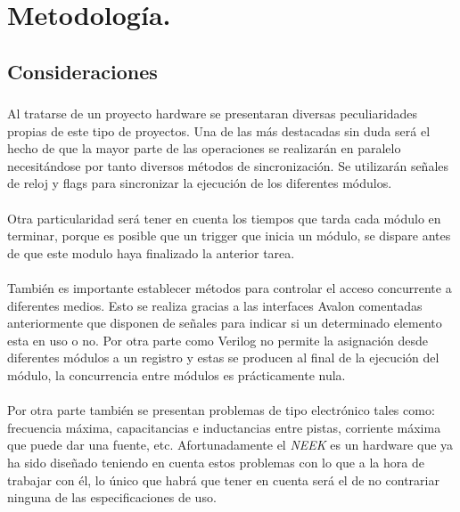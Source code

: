 \documentclass[a4paper,12pt,titlepage,final]{book}
\begin{document}
\section{Metodología.}
\subsection{Consideraciones}
\subsubsection*{}

\paragraph{}
Al tratarse de un proyecto hardware se presentaran diversas peculiaridades propias de este tipo de proyectos. Una de las más destacadas sin duda será el hecho de que la mayor parte de las operaciones se realizarán en paralelo necesitándose por tanto diversos métodos de sincronización. Se utilizarán señales de reloj y flags para sincronizar la ejecución de los diferentes módulos.

\paragraph{}
Otra particularidad será tener en cuenta los tiempos que tarda cada módulo en terminar, porque es posible que un trigger que inicia un módulo, se dispare antes de que este modulo haya finalizado la anterior tarea.

\paragraph{}
También es importante establecer métodos para controlar el acceso concurrente a diferentes medios. Esto se realiza gracias a las interfaces Avalon comentadas anteriormente que disponen de señales para indicar si un determinado elemento esta en uso o no. Por otra parte como Verilog no permite la asignación desde diferentes módulos a un registro y estas se producen al final de la ejecución del módulo, la concurrencia entre módulos es prácticamente nula.

\paragraph{}
Por otra parte también se presentan problemas de tipo electrónico tales como: frecuencia máxima, capacitancias e inductancias entre pistas, corriente máxima que puede dar una fuente, etc. Afortunadamente el \textit{NEEK} es un hardware que ya ha sido diseñado teniendo en cuenta estos problemas con lo que a la hora de trabajar con él, lo único que habrá que tener en cuenta será el de no contrariar ninguna de las especificaciones de uso.
\end{document}
